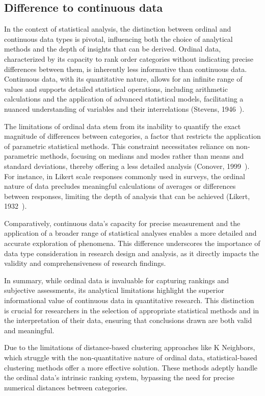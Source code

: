 \documentclass{article}
\begin{document}
\subsection*{Difference to continuous data}

In the context of statistical analysis, the distinction between ordinal and continuous data types is pivotal, influencing both the choice of analytical methods and the depth of insights that can be derived. 
Ordinal data, characterized by its capacity to rank order categories without indicating precise differences between them, is inherently less informative than continuous data. 
Continuous data, with its quantitative nature, allows for an infinite range of values and supports detailed statistical operations, including arithmetic calculations and the application of advanced statistical models, facilitating a nuanced understanding of variables and their interrelations (Stevens, 1946~\cite{Stevens1946}).

The limitations of ordinal data stem from its inability to quantify the exact magnitude of differences between categories, a factor that restricts the application of parametric statistical methods. This constraint necessitates reliance on non-parametric methods, focusing on medians and modes rather than means and standard deviations, thereby offering a less detailed analysis (Conover, 1999~\cite{Conover1999}). 
For instance, in Likert scale responses commonly used in surveys, the ordinal nature of data precludes meaningful calculations of averages or differences between responses, limiting the depth of analysis that can be achieved (Likert, 1932~\cite{Likert1932}).

Comparatively, continuous data's capacity for precise measurement and the application of a broader range of statistical analyses enables a more detailed and accurate exploration of phenomena. This difference underscores the importance of data type consideration in research design and analysis, as it directly impacts the validity and comprehensiveness of research findings.

In summary, while ordinal data is invaluable for capturing rankings and subjective assessments, 
its analytical limitations highlight the superior informational value of continuous data in quantitative research. 
This distinction is crucial for researchers in the selection of appropriate statistical methods and in the interpretation of their data, 
ensuring that conclusions drawn are both valid and meaningful.

Due to the limitations of distance-based clustering approaches like K Neighbors, which struggle with the non-quantitative nature of ordinal data, statistical-based clustering methods offer a more effective solution. These methods adeptly handle the ordinal data's intrinsic ranking system, bypassing the need for precise numerical distances between categories.
\end{document}
